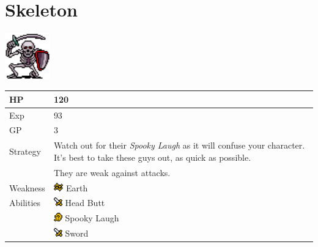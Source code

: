 \section{Skeleton}
\label{monster:skeleton}

\includegraphics[height=2cm,keepaspectratio]{./resources/monster/skeleton}

\begin{longtable}{ l p{9cm} }
	HP
	& 120
\\ \hline
	Exp
	& 93
\\ \hline
	GP
	& 3
\\ \hline
	Strategy
	& Watch out for their \textit{Spooky Laugh} as it will confuse your character. It's best to take these guys out, as quick as possible. \\
	& They are weak against \nameref{spell:cure} attacks.
\\ \hline
	Weakness
	& \includegraphics[height=1em,keepaspectratio]{./resources/effects/earth} Earth
\\ \hline
	Abilities
	& \includegraphics[height=1em,keepaspectratio]{./resources/effects/damage} Head Butt \\
	& \includegraphics[height=1em,keepaspectratio]{./resources/effects/confusion} Spooky Laugh \\
	& \includegraphics[height=1em,keepaspectratio]{./resources/effects/damage} Sword
\end{longtable}
